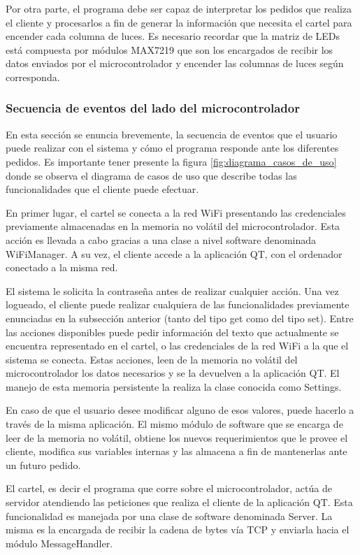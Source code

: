 Por otra parte, el programa debe ser capaz de interpretar los pedidos que realiza el cliente y procesarlos a fin de generar la información que necesita el cartel para encender cada columna de luces.
Es necesario recordar que la matriz de LEDs está compuesta por módulos MAX7219 que son los encargados de recibir los datos enviados por el microcontrolador y encender las columnas de luces según corresponda.



\subsubsection{Secuencia de eventos del lado del microcontrolador}

En esta sección se enuncia brevemente, la secuencia de eventos que el usuario puede realizar con el sistema y cómo el programa responde ante los diferentes pedidos.
Es importante tener presente la figura \ref{fig:diagrama_casos_de_uso} donde se observa el diagrama de casos de uso que describe todas las funcionalidades que el cliente puede efectuar.

En primer lugar, el cartel se conecta a la red WiFi presentando las credenciales previamente almacenadas en la memoria no volátil del microcontrolador.
Esta acción es llevada a cabo gracias a una clase a nivel software denominada WiFiManager.
A su vez, el cliente accede a la aplicación QT, con el ordenador conectado a la misma red.

El sistema le solicita la contraseña antes de realizar cualquier acción.
Una vez logueado, el cliente puede realizar cualquiera de las funcionalidades previamente enunciadas en la subsección anterior (tanto del tipo get como del tipo set).
Entre las acciones disponibles puede pedir información del texto que actualmente se encuentra representado en el cartel, o las credenciales de la red WiFi a la que el sistema se conecta.
Estas acciones, leen de la memoria no volátil del microcontrolador los datos necesarios y se la devuelven a la aplicación QT.
El manejo de esta memoria persistente la realiza la clase conocida como Settings.

En caso de que el usuario desee modificar alguno de esos valores, puede hacerlo a través de la misma aplicación.
El mismo módulo de software que se encarga de leer de la memoria no volátil, obtiene los nuevos requerimientos que le provee el cliente, modifica sus variables internas y las almacena a fin de mantenerlas ante un futuro pedido.

El cartel, es decir el programa que corre sobre el microcontrolador, actúa de servidor atendiendo las peticiones que realiza el cliente de la aplicación QT.
Esta funcionalidad es manejada por una clase de software denominada Server.
La misma es la encargada de recibir la cadena de bytes vía TCP y enviarla hacia el módulo MessageHandler.

